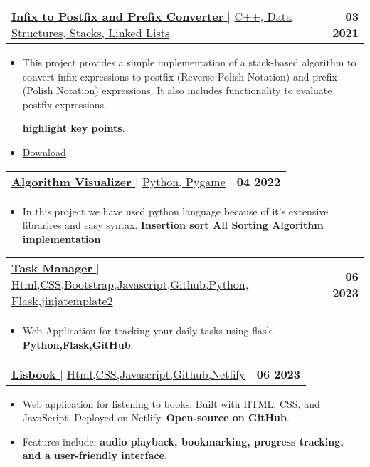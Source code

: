 \documentclass[letterpaper,11pt]{article}
\makeatletter
\newcommand{\resumeItem}[1]{
  \item\small{
    {#1 \vspace{-2pt}}
  }
}
\newcommand{\resumeProjectHeading}[2]{
    \item
    \begin{tabular*}{1.001\textwidth}{l@{\extracolsep{\fill}}r}
      \small#1 & \textbf{\small #2}\\
    \end{tabular*}\vspace{-7pt}
}
\newcommand{\resumeItemListStart}{\begin{itemize}}
\newcommand{\resumeItemListEnd}{\end{itemize}\vspace{-5pt}}
\makeatother
\begin{document}
      \resumeProjectHeading
          {\href{https://github.com/Ctoic/Infix-Postfix-Prefix-Converter.git}{\textbf{\large{\underline{Infix to Postfix and Prefix Converter}}} \href{Project Link}{\raisebox{-0.1\height}\faExternalLink }} $|$ \large{\underline{C++, Data Structures, Stacks, Linked Lists }}}{03 2021}
          \resumeItemListStart
            \resumeItem{\normalsize{This project provides a simple implementation of a stack-based algorithm to convert infix expressions to postfix (Reverse Polish Notation) and prefix (Polish Notation) expressions. It also includes functionality to evaluate postfix expressions.

            \textbf{highlight key points}.}}
            \resumeItem{\textcolor{accent} {\href{Project Link} {\underline{\normalsize{Download}}}}}
          \resumeItemListEnd
          \vspace{-13pt}
         
          \resumeProjectHeading
          {\href{https://github.com/Ctoic/Algorithm-Visualizer-Using-pygame}{\textbf{\large{\underline{Algorithm Visualizer}}} \href{https://github.com/Ctoic/Algorithm-Visualizer-Using-pygame}{\raisebox{-0.1\height}\faExternalLink }} $|$ \large{\underline{Python, Pygame}}}{04 2022}
          \resumeItemListStart
            \resumeItem{\normalsize{In this project we have used python language because of it's extensive librarires and easy syntax. \textbf{Insertion sort
            All Sorting Algorithm implementation} }}
           
          \resumeItemListEnd

          \resumeProjectHeading
          {\href{ProjectLink.com}{\textbf{\large{\underline{Task Manager}}} \href{https://github.com/Ctoic/Task-Manager.git}{\raisebox{-0.1\height}\faExternalLink }} $|$ \large{\underline{Html,CSS,Bootstrap,Javascript,Github,Python, Flask,jinjatemplate2}}}{06 2023}
          \resumeItemListStart
            \resumeItem{\normalsize{ Web Application for tracking your daily tasks using flask. \textbf{Python,Flask,GitHub}.}}

          \resumeItemListEnd
          \vspace{-4pt}

          \resumeProjectHeading
          {\href{https://lisbook.netlify.app/}{\textbf{\large{\underline{Lisbook}}} \href{https://github.com/Ctoic/Lisbook}{\raisebox{-0.1\height}\faExternalLink }} $|$ \large{\underline{Html,CSS,Javascript,Github,Netlify}}}{06 2023}
          \resumeItemListStart
            \resumeItem{\normalsize{ Web application for listening to books. Built with HTML, CSS, and JavaScript. Deployed on Netlify. \textbf{Open-source on GitHub}.}}
            \resumeItem{\normalsize{ Features include: \textbf{audio playback, bookmarking, progress tracking, and a user-friendly interface}.}}
          \resumeItemListEnd
          \vspace{-13pt}
 
\end{document}
